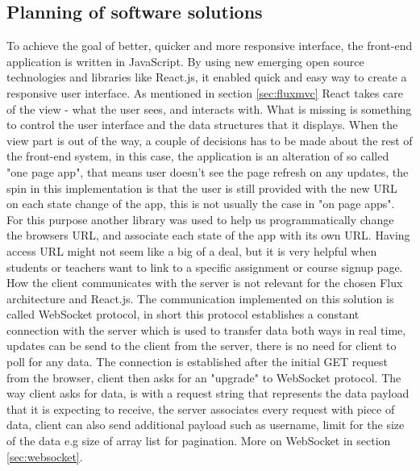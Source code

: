 \subsection{Planning of software solutions}
To achieve the goal of better, quicker and more responsive interface, the front-end application is written in JavaScript. By using new emerging open source technologies and libraries like React.js, it enabled quick and easy way to create a responsive user interface. As mentioned in section \ref{sec:fluxmvc} React takes care of the view - what the user sees, and interacts with. What is missing is something to control the user interface and the data structures that it displays. When the view part is out of the way, a couple of decisions has to be made about the rest of the front-end system, in this case, the application is an alteration of so called "one page app", that means user doesn't see the page refresh on any updates, the spin in this implementation is that the user is still provided with the new URL on each state change of the app, this is not usually the case in "on page apps". For this purpose another library was used to help us programmatically change the browsers URL, and associate each state of the app with its own URL. Having access URL might not seem like a big of a deal, but it is very helpful when students or teachers want to link to a specific assignment or course signup page.
\\How the client communicates with the server is not relevant for the chosen Flux architecture and React.js. The communication implemented on this solution is called WebSocket protocol, in short this protocol establishes a constant connection with the server which is used to transfer data both ways in real time, updates can be send to the client from the server, there is no need for client to poll for any data. The connection is established after the initial GET request from the browser, client then asks for an "upgrade" to WebSocket protocol. The way client asks for data, is with a request string that represents the data payload that it is expecting to receive, the server associates every request with piece of data, client can also send additional payload such as username, limit for the size of the data e.g size of array list for pagination. More on WebSocket in section \ref{sec:websocket}.
